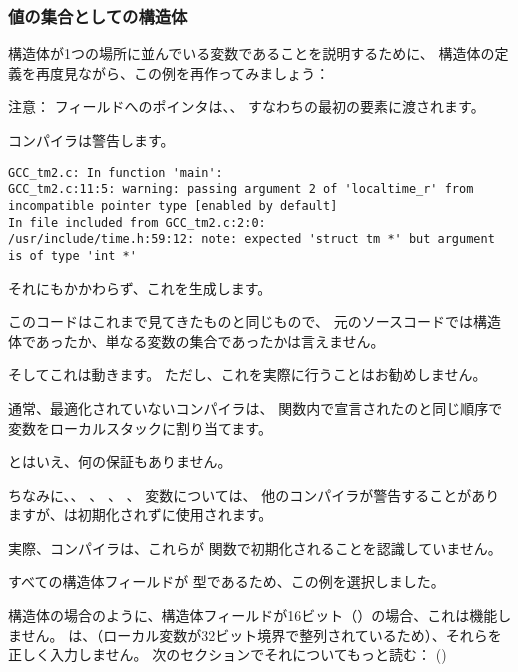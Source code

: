 ﻿\subsubsection{値の集合としての構造体}

構造体が1つの場所に並んでいる変数であることを説明するために、
構造体の定義を再度見ながら、この例を再作ってみましょう：



注意：
フィールドへのポインタは、、
すなわちの最初の要素に渡されます。

コンパイラは警告します。

\begin{lstlisting}[caption=GCC 4.7.3]
GCC_tm2.c: In function 'main':
GCC_tm2.c:11:5: warning: passing argument 2 of 'localtime_r' from incompatible pointer type [enabled by default]
In file included from GCC_tm2.c:2:0:
/usr/include/time.h:59:12: note: expected 'struct tm *' but argument is of type 'int *'
\end{lstlisting}

それにもかかわらず、これを生成します。



このコードはこれまで見てきたものと同じもので、
元のソースコードでは構造体であったか、単なる変数の集合であったかは言えません。

そしてこれは動きます。
ただし、これを実際に行うことはお勧めしません。

通常、最適化されていないコンパイラは、
関数内で宣言されたのと同じ順序で変数をローカルスタックに割り当てます。

とはいえ、何の保証もありません。

ちなみに、、 、 、
、 変数については、
他のコンパイラが警告することがありますが、は初期化されずに使用されます。

実際、コンパイラは、これらが
関数で初期化されることを認識していません。

すべての構造体フィールドが \Tint 型であるため、この例を選択しました。

構造体の場合のように、構造体フィールドが16ビット（）の場合、これは機能しません。
は、（ローカル変数が32ビット境界で整列されているため）、それらを正しく入力しません。
次のセクションでそれについてもっと読む：
\q{\StructurePackingSectionName} ()

